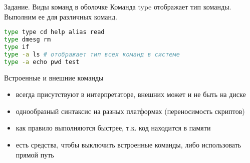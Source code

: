 \begin{frame}[fragile]{Задание. Виды команд в оболочке}
Команда  \alert{type} отображает тип команды. Выполним ее для различных команд.
\begin{lstlisting}[language=bash]
type type cd help alias read
type dmesg rm
type if
type -a ls # отображает тип всех команд в системе
type -a echo pwd test
\end{lstlisting}
\pause
Встроенные и внешние команды
\begin{itemize}
    \item всегда присутствуют в интерпретаторе, внешних может и не быть на диске
    \item однообразный синтаксис на разных платформах (переносимость скриптов)
    \item как правило выполняются быстрее, т.к. код находится в памяти
    \item есть средства, чтобы выключить встроенные команды, либо использовать прямой путь
\end{itemize}
\end{frame}
